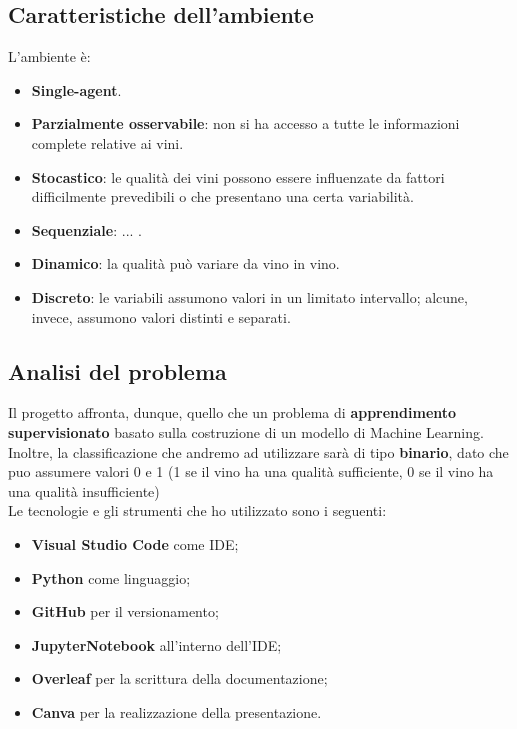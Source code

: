 \documentclass{article}
\begin{document}
\begin{titlepage}
        \subsection{Caratteristiche dell'ambiente}
        L'ambiente è:
        \begin{itemize}
            \item \textbf{Single-agent}.
            \item \textbf{Parzialmente osservabile}: non si ha accesso a tutte le informazioni complete relative ai vini.
            \item \textbf{Stocastico}: le qualità dei vini possono essere influenzate da fattori  difficilmente prevedibili o che presentano una certa variabilità.
            \item \textbf{Sequenziale}: ... .
            \item \textbf{Dinamico}: la qualità può variare da vino in vino.
            \item \textbf{Discreto}: le variabili assumono valori in un limitato intervallo; alcune, invece, assumono valori distinti e separati.
        \end{itemize}

        \subsection{Analisi del problema}
        Il progetto affronta, dunque, quello che un problema di \textbf{apprendimento supervisionato} basato sulla costruzione di un modello di Machine Learning. 
        Inoltre, la classificazione che andremo ad utilizzare sarà di tipo \textbf{binario}, dato che puo assumere valori 0 e 1 (1 se il vino ha una qualità sufficiente, 0 se il vino ha una qualità insufficiente) \\
        Le tecnologie e gli strumenti che ho utilizzato sono i seguenti:
        \begin{itemize}
            \item \textbf{Visual Studio Code} come IDE;
            \item \textbf{Python} come linguaggio;
            \item \textbf{GitHub} per il versionamento;
            \item \textbf{JupyterNotebook} all’interno dell’IDE;
            \item \textbf{Overleaf} per la scrittura della documentazione;
            \item \textbf{Canva} per la realizzazione della presentazione.
        \end{itemize}


\end{titlepage}
\end{document}
